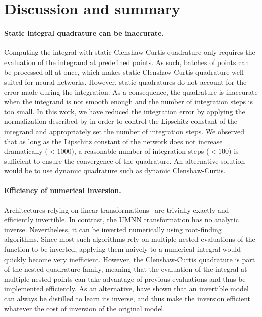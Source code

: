 \documentclass{article}
\begin{document}

\section{Discussion and summary}

\paragraph{Static integral quadrature can be inaccurate.}
Computing the integral with static Clenshaw-Curtis quadrature only requires the evaluation of the integrand at predefined points. As such, batches of points can be processed all at once, which makes static Clenshaw-Curtis quadrature well suited for neural networks. However, static quadratures do not account for the error made during the integration. As a consequence, the quadrature is inaccurate when the integrand is not smooth enough and the number of integration steps is too small. In this work, we have reduced the integration error by applying the normalization described by \cite{L_regularisation} in order to control the Lipschitz constant of the integrand and appropriately set the number of integration steps. We observed that as long as the Lipschitz constant of the network does not increase dramatically ($<1000$), a reasonable number of integration steps ($<100$) is sufficient to ensure the convergence of the quadrature. An alternative solution would be to use dynamic quadrature such as dynamic Clenshaw-Curtis.

\paragraph{Efficiency of numerical inversion.}
Architectures relying on linear transformations~\citep{MAF, IAF,  RealNVP, GLOW} are trivially exactly and efficiently invertible. In contrast, the UMNN transformation has no analytic inverse.
Nevertheless, it can be inverted numerically using root-finding algorithms.
Since most such algorithms rely on multiple nested evaluations of the function to be inverted, applying them naively to a numerical integral would quickly become very inefficient. However, the Clenshaw-Curtis quadrature is part of the nested quadrature family, meaning that the evaluation of the integral at multiple nested points can take advantage of previous evaluations and thus be implemented efficiently.
As an alternative, \cite{parallel_wavenet} have shown that an invertible model can always be distilled to learn its inverse, and thus make the inversion efficient whatever the cost of inversion of the original model.
\end{document}
